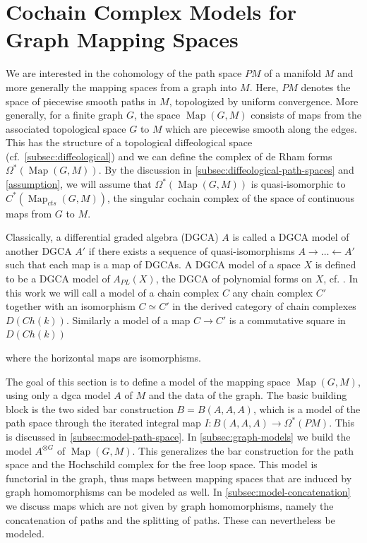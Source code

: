 \documentclass{scrartcl}
\theoremstyle{plain}
\theoremstyle{definition}
\newcommand{\quiso}{\simeq}
\newcommand{\from}{\leftarrow}
\DeclareMathOperator{\Map}{Map}
\begin{document}
\section{Cochain Complex Models for Graph Mapping Spaces}\label{sec:cochain-models}

We are interested in the cohomology of the path space $PM$ of a manifold $M$ and more generally the mapping spaces from a graph into $M$. Here, $PM$ denotes the space of piecewise smooth paths in $M$, topologized by uniform convergence. More generally, for a finite graph $G$, the space $\Map(G, M)$ consists of maps from the associated topological space $G$ to $M$ which are piecewise smooth along the edges. This has the structure of a topological diffeological space (cf.\ \cref{subsec:diffeological}) and we can define the complex of de Rham forms $\Omega^*(\Map(G, M))$. By the discussion in \cref{subsec:diffeological-path-spaces} and \cref{assumption}, we will assume that $\Omega^*(\Map(G, M))$ is quasi-isomorphic to $C^*(\Map_{cts}(G, M))$, the singular cochain complex of the space of continuous maps from $G$ to $M$. 

Classically, a differential graded algebra (DGCA) $A$ is called a DGCA model of another DGCA $A'$ if there exists a sequence of quasi-isomorphisms $A\to\dots\from A'$ such that each map is a map of DGCAs. A DGCA model of a space $X$ is defined to be a DGCA model of $A_{PL}(X)$, the DGCA of polynomial forms on $X$, cf. \cite[ch. 10]{felix2012rational}. In this work we will call a model of a chain complex $C$ any chain complex $C'$ together with an isomorphism $C\quiso C'$ in the derived category of chain complexes $D(Ch(k))$. Similarly a model of a map $C\to C'$ is a commutative square in $D(Ch(k))$
\begin{center}
\end{center}
where the horizontal maps are isomorphisms. 

The goal of this section is to define a model of the mapping space $\Map(G, M)$, using only a dgca model $A$ of $M$ and the data of the graph. The basic building block is the two sided bar construction $B=B(A, A, A)$, which is a model of the path space through the iterated integral map $I\colon B(A, A, A)\to\Omega^*(PM)$. This is discussed in \cref{subsec:model-path-space}. In \cref{subsec:graph-models} we build the model $A^{\otimes G}$ of $\Map(G, M)$. This generalizes the bar construction for the path space and the Hochschild complex for the free loop space. This model is functorial in the graph, thus maps between mapping spaces that are induced by graph homomorphisms can be modeled as well. In \cref{subsec:model-concatenation} we discuss maps which are not given by graph homomorphisms, namely the concatenation of paths and the splitting of paths. These can nevertheless be modeled. 
\end{document}
